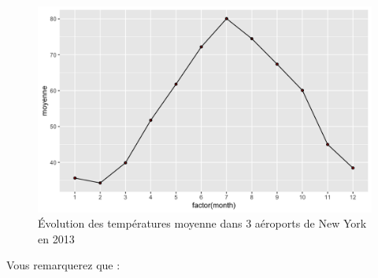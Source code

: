 \documentclass[
  a4paper,
]{article}
\begin{document}
\begin{figure}[htpb]

{\centering \includegraphics[width=0.9\linewidth]{figure/errorbars-1} 

}

\caption{Évolution des températures moyenne dans 3 aéroports de New York en 2013}\label{fig:errorbars}
\end{figure}

Vous remarquerez que :
\end{document}
